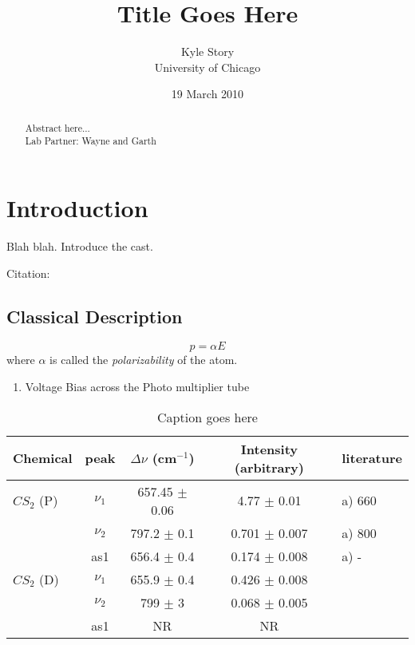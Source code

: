 \documentclass[12pt]{article}
\title{Title Goes Here}
\author{Kyle Story\\University of Chicago}
\date{19 March 2010}
\begin{document}
\maketitle

\begin{abstract}
  Abstract here...
  \\ Lab Partner: Wayne and Garth
\end{abstract}

\tableofcontents
\listoffigures
\newpage

\section{Introduction}
Blah blah.  Introduce the cast.

Citation: \cite{hu02a}

\subsection{Classical Description}

\begin{equation}
  p = \alpha E
\label{eqn:dipole_moment}
\end{equation}
where $\alpha$ is called the \textit{polarizability} of the atom.

\begin{enumerate}
  \item Voltage Bias across the Photo multiplier tube
\end{enumerate}

\begin{table}
  \caption{Caption goes here}
  \begin{center}
    \begin{tabular}{|| l | c | c | c | l ||}
      \hline
      Chemical & peak &  $\Delta \nu$ (cm$^{-1}$) & Intensity (arbitrary) & literature\\
      \hline\hline
      $CS_2$ (P)    & $\nu_1$  & 657.45 $\pm$ 0.06 & 4.77  $\pm$ 0.01  & a) 660 \\
                    & $\nu_2$  & 797.2  $\pm$ 0.1  & 0.701 $\pm$ 0.007 & a) 800 \\
                    & as1  & 656.4  $\pm$ 0.4  & 0.174 $\pm$ 0.008 & a) -  \\
      \hline
      $CS_2$ (D)    & $\nu_1$  & 655.9  $\pm$ 0.4  & 0.426 $\pm$ 0.008 & \\
                    & $\nu_2$  & 799    $\pm$ 3    & 0.068 $\pm$ 0.005 & \\
                    & as1  & NR & NR & \\
      \hline
    \end{tabular}
  \end{center}
  \label{tab:data1}
\end{table}
\end{document}
